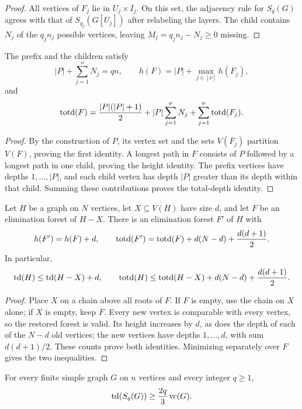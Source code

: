 \begin{proof}
All vertices of $F_j$ lie in $U_j\times I_j$. On this set, the
adjacency rule for $S_q(G)$ agrees with that of $S_{q_j}(G[U_j])$
after relabeling the layers. The child contains $N_j$ of the
$q_jn_j$ possible vertices, leaving $M_j=q_jn_j-N_j\geq0$ missing.
\end{proof}

\begin{lemma}
\label{lem:ugc-forest-accounting}
\label{lem:ugc-total-depth-accounting}
The prefix and the children satisfy
\[
 |P|+\sum_{j=1}^{\nu} N_j=qn,\qquad h(F)=|P|+\max_{j\in[\nu]}h(F_j),
\]
and
\[
 \operatorname{totd}(F)=\frac{|P|(|P|+1)}2+|P|\sum_{j=1}^{\nu} N_j+\sum_{j=1}^{\nu} \operatorname{totd}(F_j).
\]
\end{lemma}

\begin{proof}
By the construction of $P$, its vertex set and the sets $V(F_j)$
partition $V(F)$, proving the first identity. A longest path in $F$
consists of $P$ followed by a longest path in one child, proving
the height identity. The prefix vertices have depths
$1,\ldots,|P|$, and each child vertex has depth $|P|$ greater than
its depth within that child. Summing these contributions proves the
total-depth identity.
\end{proof}

\begin{lemma}
\label{lem:restore-vertices}
\label{lem:restore-total-depth}
Let $H$ be a graph on $N$ vertices, let $X\subseteq V(H)$ have size
$d$, and let $F$ be an elimination forest of $H-X$. There is an
elimination forest $F'$ of $H$ with
\[
 h(F')=h(F)+d,\qquad
 \operatorname{totd}(F')=\operatorname{totd}(F)+d(N-d)+\frac{d(d+1)}2.
\]
In particular,
\[
 \operatorname{td}(H)\leq\operatorname{td}(H-X)+d,\qquad
 \operatorname{totd}(H)\leq\operatorname{totd}(H-X)+d(N-d)+\frac{d(d+1)}2.
\]
\end{lemma}

\begin{proof}
Place $X$ on a chain above all roots of $F$. If $F$ is empty, use
the chain on $X$ alone; if $X$ is empty, keep $F$.
Every new vertex is comparable with every vertex, so the restored
forest is valid. Its height increases by $d$, as does the depth of
each of the $N-d$ old vertices; the new vertices have depths
$1,\ldots,d$, with sum $d(d+1)/2$. These counts prove both
identities. Minimizing separately over $F$ gives the two inequalities.
\end{proof}

\begin{theorem}\label{thm:ugc-structural}
For every finite simple graph $G$ on $n$ vertices and every integer
$q\geq1$,
\begin{equation}\label{eq:ugc-structural}
  \operatorname{td}(S_q(G))\geq
  \frac{2q}{3}\operatorname{vc}(G).
\end{equation}
\end{theorem}

